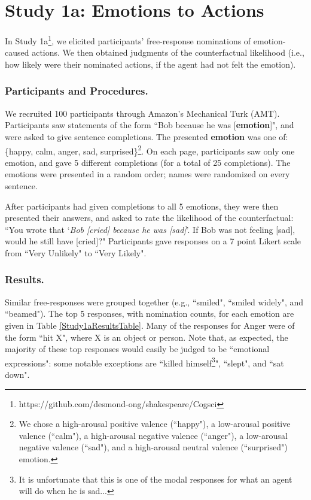 \documentclass[10pt,letterpaper]{article}
\begin{document}


\section{Study 1a: Emotions to Actions}

	In Study 1a\footnote{https://github.com/desmond-ong/shakespeare/Cogsci}, we elicited participants' free-response nominations of emotion-caused actions. We then obtained judgments of the counterfactual likelihood (i.e., how likely were their nominated actions, if the agent had not felt the emotion).


\subsubsection{Participants and Procedures.} 
We recruited 100 participants through Amazon's Mechanical Turk (AMT). Participants saw statements of the form ``Bob \underline{\hspace{3em}} because he was [\textbf{emotion}]", and were asked to give sentence completions. The presented \textbf{emotion} was one of: \{happy, calm, anger, sad, surprised\}\footnote{We chose a high-arousal positive valence (``happy"), a low-arousal positive valence (``calm"), a high-arousal negative valence (``anger"), a low-arousal negative valence (``sad"), and a high-arousal neutral valence (``surprised") emotion.}. On each page, participants saw only one emotion, and gave 5 different completions (for a total of 25 completions). The emotions were presented in a random order; names were randomized on every sentence.

After participants had given completions to all 5 emotions, they were then presented their answers, and asked to rate the likelihood of the counterfactual: ``You wrote that `\textit{Bob [cried] because he was [sad]}'. If Bob was not feeling [sad], would he still have [cried]?" Participants gave responses on a 7 point Likert scale from ``Very Unlikely" to ``Very Likely". 



\subsubsection{Results.} 
Similar free-responses were grouped together (e.g., ``smiled", ``smiled widely", and ``beamed"). The top 5 responses, with nomination counts, for each emotion are given in Table \ref{Study1aResultsTable}. Many of the responses for Anger were of the form ``hit X", where X is an object or person. Note that, as expected, the majority of these top responses would easily be judged to be ``emotional expressions": some notable exceptions are ``killed himself\footnote{It is unfortunate that this is one of the modal responses for what an agent will do when he is sad...}", ``slept", and ``sat down".
\end{document}
